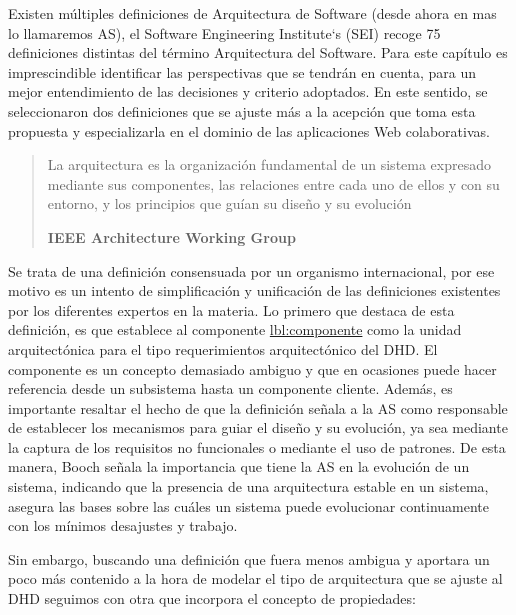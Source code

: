 Existen múltiples definiciones de Arquitectura de Software (desde ahora en mas
lo llamaremos AS), el Software Engineering Institute‘s
(SEI)\cite{arquitectura23} recoge 75 definiciones distintas del término
Arquitectura del Software. Para este capítulo es imprescindible identificar las perspectivas que se tendrán en cuenta, para un mejor entendimiento de las decisiones y criterio adoptados. En este sentido, se seleccionaron 
dos definiciones que se ajuste más a la acepción que toma esta propuesta y
especializarla en el dominio de las aplicaciones Web colaborativas.

\begin{quote}

La arquitectura es la organización fundamental de un sistema
expresado mediante sus componentes, las relaciones entre cada uno de ellos y
con su entorno, y los principios que guían su diseño y su evolución

\begin{flushright} \textbf{IEEE Architecture Working Group} \end{flushright}

\end{quote}

Se trata de una definición consensuada por un organismo internacional, por
ese motivo es un intento de simplificación y unificación de las definiciones
existentes por los diferentes expertos en la materia. Lo primero que destaca
de esta definición, es que establece al componente \hyperref[componente]{lbl:componente} como la unidad arquitectónica para el tipo requerimientos arquitectónico del DHD. El componente es un concepto demasiado ambiguo y que en
ocasiones puede hacer referencia desde un subsistema hasta un componente
cliente. Además, es importante resaltar el hecho de que la definición señala a la AS como responsable de establecer los mecanismos para guiar el diseño y su
evolución, ya sea mediante la captura de los requisitos no funcionales
o mediante el uso de patrones. De esta manera, Booch \cite{15} señala la
importancia que tiene la AS en la evolución de un sistema, indicando que
la presencia de una arquitectura estable en un sistema, asegura las bases
sobre las cuáles un sistema puede evolucionar continuamente con los
mínimos desajustes y trabajo.

Sin embargo, buscando una definición que fuera menos ambigua y aportara un
poco más contenido a la hora de modelar el tipo de arquitectura que se ajuste al DHD seguimos con otra que incorpora el concepto de propiedades:

